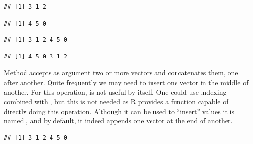 \documentclass[krantz2]{krantz}\usepackage{knitr}%
\begin{document}
\begin{knitrout}\footnotesize
{}\color{fgcolor}\begin{kframe}
\begin{alltt}
 \hlkwb{<-} \hlstd{(}\hlstd{,} \hlstd{,} \hlstd{)}
\end{alltt}
\begin{verbatim}
## [1] 3 1 2
\end{verbatim}
\begin{alltt}
 \hlkwb{<-} \hlstd{(}\hlstd{,} \hlstd{,} \hlstd{)}
\end{alltt}
\begin{verbatim}
## [1] 4 5 0
\end{verbatim}
\begin{alltt}
 \hlkwb{<-} 
\end{alltt}
\begin{verbatim}
## [1] 3 1 2 4 5 0
\end{verbatim}
\begin{alltt}
 \hlkwb{<-} 
\end{alltt}
\begin{verbatim}
## [1] 4 5 0 3 1 2
\end{verbatim}
\end{kframe}
\end{knitrout}

Method  accepts as argument two or more vectors and concatenates them, one after another. Quite frequently we may need to insert one vector in the middle of another. For this operation,  is not useful by itself. One could use indexing combined with , but this is not needed as R provides a function capable of directly doing this operation. Although it can be used to ``insert'' values it is named , and by default, it indeed appends one vector at the end of another.

\begin{knitrout}\footnotesize
{}\color{fgcolor}\begin{kframe}
\begin{alltt}
\end{alltt}
\begin{verbatim}
## [1] 3 1 2 4 5 0
\end{verbatim}
\end{kframe}
\end{knitrout}
\end{document}
